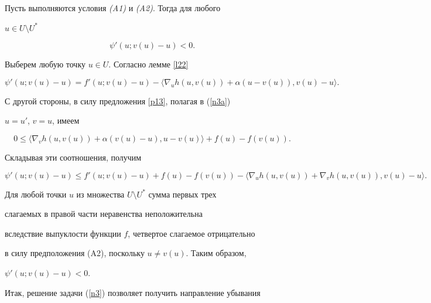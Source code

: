 \begin{lems}\label{ldesc}


Пусть выполняются условия {\em (A1)} и {\em (A2)}. Тогда для любого 


$u \in U \setminus U^*$


$$


\psi'(u; v(u)-u) < 0.


$$


\end{lems}





\begin{pf}


Выберем любую точку $u \in U$. Согласно лемме \ref{l22}


$$


\psi'(u;v(u)-u) = 


f'(u;v(u)-u) - \langle \nabla_u h(u, v(u)) + 


\alpha (u-v(u)),v(u)-u \rangle.


$$


С другой стороны, в силу предложения \ref{p13}, полагая в (\ref{n3a})


$u=u'$, $v=u$, имеем


$$


0 \le \langle \nabla_v h(u,v(u)) + \alpha (v(u) - u), u - v(u) \rangle  + 


f(u) - f(v(u)).


$$


Складывая эти соотношения, получим


$$


\psi'(u;v(u)-u) \le f'(u; v(u)-u) +f(u) - f(v(u)) -


\langle \nabla_u h(u,v(u)) + \nabla_v h(u,v(u)), v(u) - u \rangle.  


$$


Для любой точки $u$ из множества $U \setminus U^*$ сумма первых трех 


слагаемых в правой части неравенства неположительна 


вследствие выпуклости функции $f$, четвертое слагаемое отрицательно


в силу предположения (A2), поскольку $u \not= v(u)$. Таким образом, 


$\psi'(u; v(u)-u) < 0$.


\end{pf}





Итак, решение задачи (\ref{n3}) позволяет получить направление убывания 


